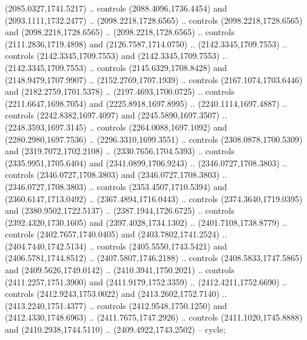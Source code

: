 \begin{scope}[shift={(19.44451,-318.97965)}]
\begin{scope}[shift={(-2093.8013,-1176.4989)}]
\begin{scope}
\begin{scope}
          (2085.0327,1741.5217) .. controls (2088.4096,1736.4454) and
          (2093.1111,1732.2477) .. (2098.2218,1728.6565) .. controls
          (2098.2218,1728.6565) and (2098.2218,1728.6565) .. (2098.2218,1728.6565) ..
          controls (2111.2836,1719.4898) and (2126.7587,1714.0750) ..
          (2142.3345,1709.7553) .. controls (2142.3345,1709.7553) and
          (2142.3345,1709.7553) .. (2142.3345,1709.7553) .. controls
          (2145.6329,1708.8428) and (2148.9479,1707.9907) .. (2152.2769,1707.1939) ..
          controls (2167.1074,1703.6446) and (2182.2759,1701.5378) ..
          (2197.4693,1700.0725) .. controls (2211.6647,1698.7054) and
          (2225.8918,1697.8995) .. (2240.1114,1697.4887) .. controls
          (2242.8382,1697.4097) and (2245.5890,1697.3507) .. (2248.3593,1697.3145) ..
          controls (2264.0088,1697.1092) and (2280.2980,1697.7536) ..
          (2296.3310,1699.3551) .. controls (2308.0878,1700.5309) and
          (2319.7072,1702.2108) .. (2330.7656,1704.5393) .. controls
          (2335.9951,1705.6404) and (2341.0899,1706.9243) .. (2346.0727,1708.3803) ..
          controls (2346.0727,1708.3803) and (2346.0727,1708.3803) ..
          (2346.0727,1708.3803) .. controls (2353.4507,1710.5394) and
          (2360.6147,1713.0492) .. (2367.4894,1716.0443) .. controls
          (2374.3640,1719.0395) and (2380.9502,1722.5137) .. (2387.1944,1726.6725) ..
          controls (2392.4320,1730.1605) and (2397.4028,1734.1302) ..
          (2401.7108,1738.8779) .. controls (2402.7657,1740.0405) and
          (2403.7802,1741.2524) .. (2404.7440,1742.5134) .. controls
          (2405.5550,1743.5421) and (2406.5781,1744.8512) .. (2407.5807,1746.2188) ..
          controls (2408.5833,1747.5865) and (2409.5626,1749.0142) ..
          (2410.3941,1750.2021) .. controls (2411.2257,1751.3900) and
          (2411.9179,1752.3359) .. (2412.4211,1752.6690) .. controls
          (2412.9243,1753.0022) and (2413.2602,1752.7140) .. (2413.2240,1751.4377) ..
          controls (2412.9548,1750.1250) and (2412.4330,1748.6963) ..
          (2411.7675,1747.2926) .. controls (2411.1020,1745.8888) and
          (2410.2938,1744.5110) .. (2409.4922,1743.2502) -- cycle;


\end{scope}
\end{scope}
\end{scope}
\end{scope}

